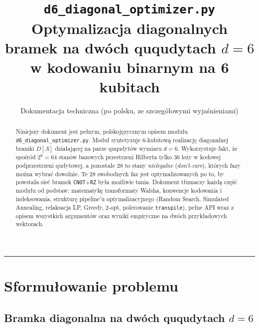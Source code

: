 \documentclass[11pt,a4paper]{article}
\title{\texttt{d6\_diagonal\_optimizer.py}\\[2pt]
       \large Optymalizacja diagonalnych bramek na dwóch ququdytach $d=6$\\
       w kodowaniu binarnym na 6 kubitach}
\author{Dokumentacja techniczna (po polsku, ze szczegółowymi wyjaśnieniami)}
\date{}
\newcommand{\1}{\mathbf{1}}
\newcommand{\code}[1]{\texttt{#1}}
\begin{document}
\maketitle

\begin{abstract}
\noindent
Niniejszy dokument jest pełnym, polskojęzycznym opisem modułu
\code{d6\_diagonal\_optimizer.py}. Moduł syntetyzuje 6\nobreakdash-kubitową
realizację diagonalnej bramki $D[\Lambda]$ działającej na parze
ququdytów wymiaru $d=6$. Wykorzystuje fakt, że spośród $2^{6}=64$ stanów
bazowych przestrzeni Hilberta tylko $36$ leży w kodowej podprzestrzeni
qudytowej, a pozostałe $28$ to stany \emph{nielegalne} (\emph{don't-care}),
których fazy można wybrać dowolnie. Te 28 swobodnych faz jest
optymalizowanych po to, by powstała sieć bramek \code{CNOT}+\code{RZ}
była możliwie tania. Dokument tłumaczy każdą część modułu od podstaw:
matematykę transformaty Walsha, konwencje kodowania i indeksowania,
strukturę pipeline'u optymalizacyjnego (Random Search, Simulated
Annealing, relaksacja LP, Greedy, 2\nobreakdash-opt, polerowanie
\code{transpile}), pełne API wraz z opisem wszystkich argumentów oraz
wyniki empiryczne na dwóch przykładowych wektorach.
\end{abstract}

\tableofcontents
\bigskip\hrule\bigskip

\section{Sformułowanie problemu}
\label{sec:problem}

\subsection{Bramka diagonalna na dwóch ququdytach $d=6$}
\end{document}
